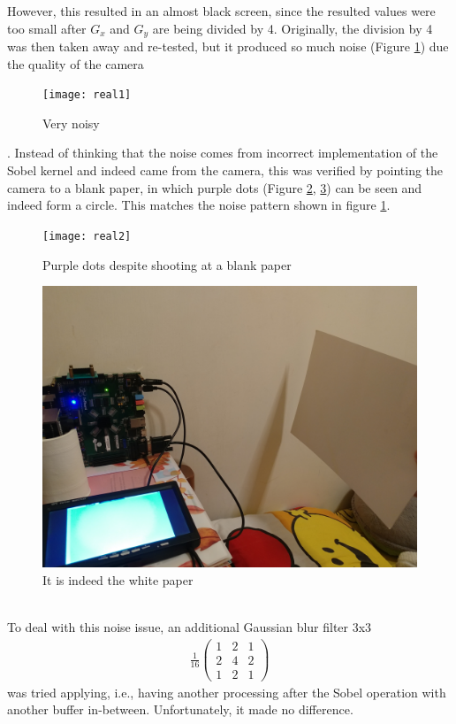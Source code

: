 \documentclass{article}
\begin{document}
	However, this resulted in an almost black screen, since the resulted values were too small after $G_x$ and $G_y$ are being divided by 4. Originally, the division by 4 was then taken away and re-tested, but it produced so much noise (Figure \ref{fig:real1}) due the quality of the camera\begin{figure}[h]
		\centering
		\texttt{[image: real1]}
		\caption{Very noisy}
		\label{fig:real1}
	\end{figure}. Instead of thinking that the noise comes from incorrect implementation of the Sobel kernel and indeed came from the camera, this was verified by pointing the camera to a blank paper, in which purple dots (Figure \ref{fig:real2}, \ref{fig:real3}) can be seen and indeed form a circle. This matches the noise pattern shown in figure \ref{fig:real1}.
\begin{figure}[h]
		\centering
		\texttt{[image: real2]}
		\caption{Purple dots despite shooting at a blank paper}
		\label{fig:real2}
	\end{figure}
\begin{figure}[h]
		\centering
		\includegraphics[scale=0.09]{real3}
		\caption{It is indeed the white paper}
		\label{fig:real3}
	\end{figure}
	\\
	
	To deal with this noise issue, an additional Gaussian blur filter 3x3 
	\begin{align*}
		\frac{1}{16}
		\begin{pmatrix}
			1&2&1\\
			2&4&2\\
			1&2&1
		\end{pmatrix}
	\end{align*}
	was tried applying, i.e., having another processing after the Sobel operation with another buffer in-between. Unfortunately, it made no difference.
	\\
	
\end{document}
